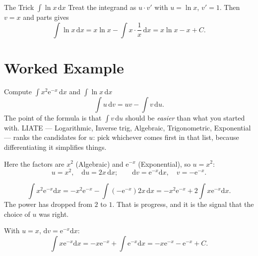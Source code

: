 \begin{rulebox}{The Trick $\int \ln x\,\mathrm{d}x$}
Treat the integrand as $u\cdot v'$ with $u=\ln x$, $v'=1$. Then $v=x$
and parts gives
\[
  \int \ln x\,\mathrm{d}x
    = x\ln x - \int x\cdot\frac1x\,\mathrm{d}x = x\ln x - x + C .
\]
\end{rulebox}

\section{Worked Example}

\begin{worked}{Compute $\displaystyle\int x^{2}\mathrm{e}^{-x}\,\mathrm{d}x$ and $\displaystyle\int\ln x\,\mathrm{d}x$}
\[
  \int u\,\mathrm{d}v=uv-\int v\,\mathrm{d}u .
\]
The point of the formula is that $\int v\,\mathrm{d}u$ should be
\emph{easier} than what you started with. LIATE --- Logarithmic, Inverse
trig, Algebraic, Trigonometric, Exponential --- ranks the candidates for
$u$: pick whichever comes first in that list, because differentiating it
simplifies things.

Here the factors are $x^{2}$ (Algebraic) and $\mathrm{e}^{-x}$
(Exponential), so $u=x^{2}$:
\[
  u=x^{2},\quad \mathrm{d}u=2x\,\mathrm{d}x;
  \qquad
  \mathrm{d}v=\mathrm{e}^{-x}\mathrm{d}x,\quad v=-\mathrm{e}^{-x} .
\]

\[
  \int x^{2}\mathrm{e}^{-x}\mathrm{d}x
  =-x^{2}\mathrm{e}^{-x}-\int(-\mathrm{e}^{-x})2x\,\mathrm{d}x
  =-x^{2}\mathrm{e}^{-x}+2\int x\mathrm{e}^{-x}\mathrm{d}x .
\]
The power has dropped from $2$ to $1$. That is progress, and it is the
signal that the choice of $u$ was right.

With $u=x$, $\mathrm{d}v=\mathrm{e}^{-x}\mathrm{d}x$:
\[
  \int x\mathrm{e}^{-x}\mathrm{d}x
  =-x\mathrm{e}^{-x}+\int\mathrm{e}^{-x}\mathrm{d}x
  =-x\mathrm{e}^{-x}-\mathrm{e}^{-x}+C .
\]


\end{worked}
